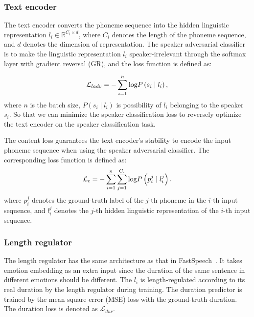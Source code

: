 \documentclass[journal,comsoc]{IEEEtran}
\begin{document}
\subsubsection{Text encoder}
The text encoder converts the phoneme sequence into the hidden linguistic representation $l_i \in \mathbb{R}^{C_i \times d}$, where $C_i$ denotes the length of the phoneme sequence, and $d$ denotes the dimension of representation.
The speaker adversarial classifier is to make the linguistic representation $l_i$ speaker-irrelevant through the softmax layer with gradient reversal (GR), and the loss function is defined as:

\begin{equation}
    {{\cal L}_{ladv}} =  - \sum\limits_{i = 1}^n {\log } P\left( {{s_i}\mid {l_i}} \right),
\end{equation}
where $n$ is the batch size, $P( {{s_i}\mid {l_i}})$ is possibility of $l_i$ belonging to the speaker $s_i$.
So that we can minimize the speaker classification loss to reversely optimize the text encoder on the speaker classification task.

The content loss guarantees the text encoder's stability to encode the input phoneme sequence when using the speaker adversarial classifier.
The corresponding loss function is defined as:
\begin{equation}
    {{\cal L}_{c}} =  - \sum\limits_{i = 1}^n \sum\limits_{j = 1}^{C_i} {\log } P\left( {{p_i^{j}}\mid {l_i^{j}}} \right).
\end{equation} 
where $p_i^{j}$ denotes the ground-truth label of the $j$-th phoneme in the $i$-th input sequence, and $l_i^{j}$ denotes the $j$-th hidden linguistic representation of the $i$-th input sequence.

\subsubsection{Length regulator}
The length regulator has the same architecture as that in FastSpeech~\cite{Ren2019FastSpeechFR}.
It takes emotion embedding as an extra input since the duration of the same sentence in different emotions should be different. 
The ${l_i}$ is length-regulated according to its real duration by the length regulator during training.
The duration predictor is trained by the mean square error (MSE) loss with the ground-truth duration. The duration loss is denoted as $\mathcal{L}_{dur}$. 
\end{document}

